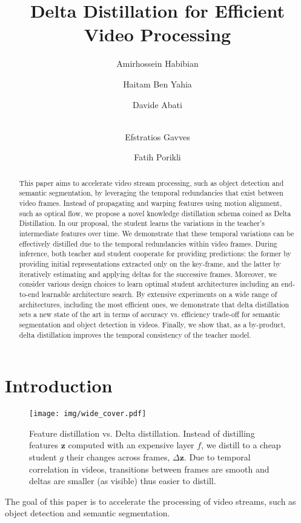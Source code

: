 \documentclass[runningheads]{llncs}
\def\z{\mathbf{z}}
\begin{document}
\pagestyle{headings}
\mainmatter
\title{Delta Distillation for Efficient Video Processing}
\author{
Amirhossein Habibian
\and Haitam Ben Yahia
\and Davide Abati\and\\
Efstratios Gavves
\and Fatih Porikli
}
\maketitle
\begin{abstract}
This paper aims to accelerate video stream processing, such as object detection and semantic segmentation, by leveraging the temporal redundancies that exist between video frames. Instead of propagating and warping features using motion alignment, such as optical flow, we propose a novel knowledge distillation schema coined as Delta Distillation.
In our proposal, the student learns the variations in the teacher's intermediate features over time. We demonstrate that these temporal variations can be effectively distilled due to the temporal redundancies within video frames.
During inference, both teacher and student cooperate for providing predictions: the former by providing initial representations extracted only on the key-frame, and the latter by iteratively estimating and applying deltas for the successive frames.
Moreover, we consider various design choices to learn optimal student architectures including an end-to-end learnable architecture search.
By extensive experiments on a wide range of architectures, including the most efficient ones, we demonstrate that delta distillation sets a new state of the art in terms of accuracy vs. efficiency trade-off for semantic segmentation and object detection in videos. Finally, we show that, as a by-product, delta distillation improves the temporal consistency of the teacher model.
\end{abstract} \section{Introduction}
\label{sec:introduction}
\begin{figure}[t]
\centering
\texttt{[image: img/wide\_cover.pdf]}
\caption{Feature distillation vs. Delta distillation. Instead of distilling features $\z$ computed with an expensive layer $f$, we distill to a cheap student $g$ their changes across frames, $\Delta\z$. Due to temporal correlation in videos, transitions between frames are smooth and deltas are smaller (as visible) thus easier to distill.}
\vspace{-4mm}
\label{fig:cover_fig}
\end{figure} The goal of this paper is to accelerate the processing of video streams, such as object detection and semantic segmentation. 
\end{document}
